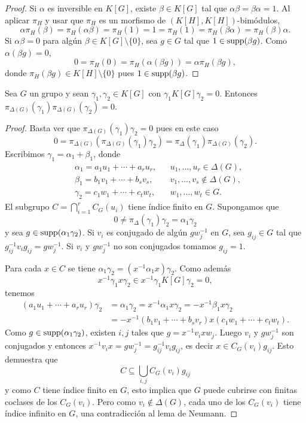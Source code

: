 \begin{proof}
	Si $\alpha$ es inversible en $K[G]$, existe $\beta\in K[G]$ tal que
	$\alpha\beta=\beta\alpha=1$. Al aplicar $\pi_H$ y usar que $\pi_H$ es un
	morfismo de $(K[H],K[H])$-bimódulos, 
	\[
		\alpha\pi_H(\beta)=\pi_H(\alpha\beta)=\pi_H(1)=1=\pi_H(1)=\pi_H(\beta\alpha)=\pi_H(\beta)\alpha.
	\]
	Si $\alpha\beta=0$ para algún $\beta\in K[G]\setminus\{0\}$, sea $g\in G$
	tal que $1\in\operatorname{supp}(\beta g)$. Como $\alpha(\beta g)=0$, 
	\[
		0=\pi_H(0)=\pi_H(\alpha(\beta g))=\alpha\pi_H(\beta g),
	\]
	donde $\pi_H(\beta g)\in K[H]\setminus\{0\}$ pues $1\in\operatorname{supp}(\beta g)$. 
\end{proof}

\begin{lemma}[Passman]
	\label{lem:Passman}
	Sea $G$ un grupo y sean  
	$\gamma_1,\gamma_2\in K[G]$ con $\gamma_1K[G]\gamma_2=0$.
	Entonces $\pi_{\Delta(G)}(\gamma_1)\pi_{\Delta(G)}(\gamma_2)=0$.
\end{lemma}

\begin{proof}
	Basta ver que $\pi_{\Delta(G)}(\gamma_1)\gamma_2=0$ pues en este caso 
	\[
		0=\pi_{\Delta(G)}(\pi_{\Delta(G)}(\gamma_1)\gamma_2)=\pi_{\Delta}(\gamma_1)\pi_{\Delta(G)}(\gamma_2).
	\]
	Escribimos $\gamma_1=\alpha_1+\beta_1$, donde 
	\begin{align*}
		&\alpha_1=a_1u_1+\cdots+a_ru_r, && u_1,\dots,u_r\in\Delta(G),\\
		&\beta_1=b_1v_1+\cdots+b_sv_s, && v_1,\dots,v_s\not\in\Delta(G),\\
		&\gamma_2=c_1w_1+\cdots+c_tw_t,&& w_1,\dots,w_t\in G.
	\end{align*}
	El subgrupo $C=\bigcap_{i=1}^rC_G(u_i)$ tiene índice finito en $G$.
	Supongamos que 
	\[
		0\ne \pi_{\Delta}(\gamma_1)\gamma_2=\alpha_1\gamma_2
	\]
	y sea $g\in\operatorname{supp}(\alpha_1\gamma_2)$. 
	Si $v_i$ es conjugado de algún
	$gw_j^{-1}$ en $G$, sea $g_{ij}\in G$ tal que
	$g_{ij}^{-1}v_ig_{ij}=gw_j^{-1}$. Si $v_i$ y $gw_j^{-1}$ no son conjugados
	tomamos $g_{ij}=1$. 

	Para cada $x\in C$ se tiene $\alpha_1\gamma_2=(x^{-1}\alpha_1x)\gamma_2$. Como además 
	\[
		x^{-1}\gamma_1x\gamma_2\in x^{-1}\gamma_1K[G]\gamma_2=0,
	\]
	tenemos 
	\begin{align*}
		(a_1u_1+\cdots+a_ru_r)\gamma_2&=
		\alpha_1\gamma_2=x^{-1}\alpha_1x\gamma_2=-x^{-1}\beta_1x\gamma_2\\
		&=-x^{-1}(b_1v_1+\cdots+b_sv_r)x(c_1w_1+\cdots+c_tw_t).
	\end{align*}
	Como $g\in\operatorname{supp}(\alpha_1\gamma_2)$, existen $i,j$ tales que $g=x^{-1}v_ixw_j$.
	Luego $v_i$ y $gw_j^{-1}$ son conjugados y entonces 
	$x^{-1}v_ix=gw_j^{-1}=g_{ij}^{-1}v_ig_{ij}$, es decir $x\in C_G(v_i)g_{ij}$. Esto demuestra que
	\[
		C\subseteq\bigcup_{i,j}C_G(v_i)g_{ij}
	\]
	y como $C$ tiene índice finito en $G$, esto implica que $G$ puede cubrirse
	con finitas coclases de los $C_G(v_i)$. Pero como $v_i\not\in\Delta(G)$, cada
	uno de los $C_G(v_i)$ tiene índice infinito en $G$, una contradicción al lema
	de Neumann.
\end{proof}

